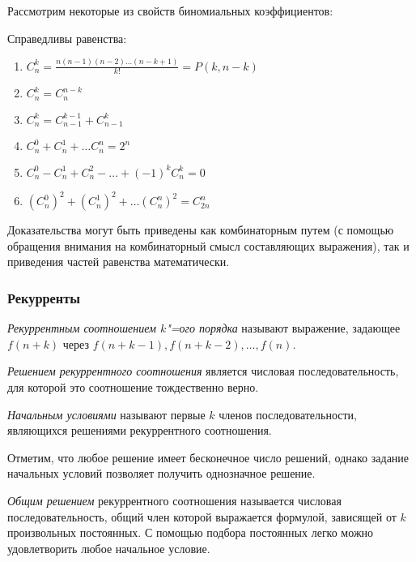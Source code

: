 Рассмотрим некоторые из свойств биномиальных коэффициентов:
\begin{theorem}
    Справедливы равенства:
    \begin{enumerate}
        \item $\displaystyle C_n^k = 
            \frac{n(n - 1)(n - 2) \dots (n - k + 1)}{k!} = P(k, n - k)$
        \item $\displaystyle C_n^k = C_n^{n - k}$
        \item $\displaystyle C_n^k = C_{n - 1}^{k - 1} + C_{n - 1}^k$
        \item $\displaystyle C_n^0 + C_n^1 + \dots C_n^n = 2^n$
        \item $\displaystyle C_n^0 - C_n^1 + C_n^2 - \dots + (-1)^k C_n^k = 0$
        \item $\displaystyle (C_n^0)^2 + (C_n^1)^2 + \dots (C_n^n)^2 = C_{2n}^n$
    \end{enumerate}
\end{theorem}
Доказательства могут быть приведены как комбинаторным путем (с помощью обращения внимания 
на комбинаторный смысл составляющих выражения), так и приведения частей равенства математически.
\subsubsection{Рекурренты}

\begin{definition}
    \textit{Рекуррентным соотношением $k$"=ого порядка} называют
    выражение, задающее $f(n + k)$ через 
    $f(n + k - 1), f(n + k - 2), \dots, f(n)$.

\end{definition}

\begin{definition}
    \textit{Решением рекуррентного соотношения} является числовая последовательность,
    для которой это соотношение тождественно верно.
\end{definition}

\begin{definition}
    \textit{Начальным условиями} называют первые $k$ членов последовательности,
    являющихся решениями рекуррентного соотношения.
\end{definition}

Отметим, что любое решение имеет бесконечное число решений, однако задание
начальных условий позволяет получить однозначное решение.

\begin{definition}
    \textit{Общим решением} рекуррентного соотношения называется
    числовая последовательность, общий член
    которой выражается формулой, зависящей от $k$ произвольных
    постоянных. С помощью подбора постоянных легко можно
    удовлетворить любое начальное условие.
\end{definition}

